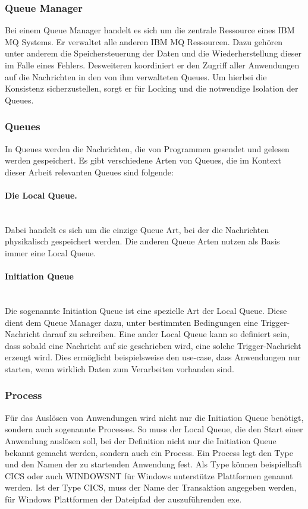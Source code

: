 \subsubsection{Queue Manager}
Bei einem Queue Manager handelt es sich um die zentrale Ressource eines IBM MQ Systems.
Er verwaltet  alle anderen IBM MQ Ressourcen.
Dazu gehören unter anderem die Speichersteuerung der Daten und die Wiederherstellung dieser im Falle eines Fehlers.
Desweiteren koordiniert er den Zugriff aller Anwendungen auf die Nachrichten in den von ihm verwalteten Queues.
Um hierbei die Konsistenz sicherzustellen, sorgt er für Locking und die notwendige Isolation der Queues.
\cite{Aranha.2013}

\subsubsection{Queues}
In Queues werden die Nachrichten, die von Programmen gesendet und gelesen werden gespeichert.
Es gibt verschiedene Arten von Queues, die im Kontext dieser Arbeit relevanten Queues sind folgende:

\paragraph{Die Local Queue.}~\\
Dabei handelt es sich um die einzige Queue Art, bei der die Nachrichten physikalisch gespeichert werden.
Die anderen Queue Arten nutzen als Basis immer eine Local Queue.

\paragraph{Initiation Queue}~\\
Die sogenannte \glqq Initiation Queue\grqq{} ist eine spezielle Art der Local Queue.
Diese dient dem Queue Manager dazu, unter bestimmten Bedingungen eine Trigger-Nachricht darauf zu schreiben.
Eine ander Local Queue kann so definiert sein, dass sobald eine Nachricht auf sie geschrieben wird, eine solche Trigger-Nachricht erzeugt wird.
Dies ermöglicht beispielsweise den use-case, dass Anwendungen nur starten, wenn wirklich Daten zum Verarbeiten vorhanden sind.
\cite{Aranha.2013}

\subsubsection{Process}
Für das Auslösen von Anwendungen wird nicht nur die Initiation Queue benötigt, sondern auch sogenannte \glqq Processes\grqq.
So muss der Local Queue, die den Start einer Anwendung auslösen soll, bei der Definition nicht nur die Initiation Queue bekannt gemacht werden, sondern auch ein Process.
Ein Process legt den \glqq Type\grqq{} und den Namen der zu startenden Anwendung fest.
Als \glqq Type\grqq{} können beispielhaft CICS oder auch WINDOWSNT für Windows unterstütze Plattformen genannt werden.
Ist der \glqq Type\grqq{} CICS,  muss der Name der Transaktion angegeben werden, für Windows Plattformen der Dateipfad der auszuführenden exe.
\cite{Aranha.2013}

